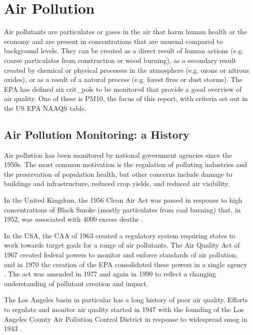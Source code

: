 	\section{Air Pollution}\label{sec:introdairpollution}
Air pollutants are particulates or gases in the air that harm human health or the economy and are present in concentrations that are unusual compared to background levels.  They can be created as a direct result of human actions (e.g. coarse particulates from construction or wood burning), as a secondary result created by chemical or physical processes in the atmosphere (e.g. ozone or nitrous oxides), or as a result of a natural process (e.g. forest fires or dust storms).  The \ac{EPA} has defined six \glspl{crit_pol} to be monitored that provide a good overview of air quality.  One of these is \ac{PM10}, the focus of this report,  with criteria set out in the US EPA NAAQS table.

\subsection{Air Pollution Monitoring: a History}
\label{sec:apmonitoring}
Air pollution has been monitored by national government agencies since the 1950s.  The most common motivation is the regulation of polluting industries and the preservation of population health, but other concerns include damage to buildings and infrastructure, reduced crop yields, and reduced air visibility.  

In the United Kingdom, the 1956 Clean Air Act was passed in response to high concentrations of Black Smoke (mostly particulates from coal burning) that, in 1952, was associated with 4000 excess deaths \cite{shaddick2014case}.

In the USA, the \ac{CAA} of 1963 created a regulatory system requiring states to work towards target goals for a range of air pollutants.  The Air Quality Act of 1967 created federal powers to monitor and enforce standards of air pollution, and in 1970 the creation of the \ac{EPA} consolidated these powers in a single agency %
.  The act was amended in 1977 and again in 1990 to reflect a changing understanding of pollutant creation and impact.  

The Los Angeles basin in particular has a long history of poor air quality.  Efforts to regulate and monitor air quality started in 1947 with the founding of the Los Angeles County Air Pollution Control District in response to widespread smog in 1943 
.



